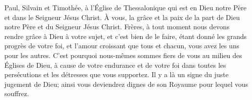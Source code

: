 Paul, Silvain et Timothée,
	à l’Église de Thessalonique qui est en Dieu notre Père
		et dans le Seigneur Jésus Christ.
À vous, la grâce et la paix de la part de Dieu notre Père et du Seigneur Jésus Christ.
Frères, à tout moment nous devons rendre grâce à Dieu à votre sujet,
	et c’est bien de le faire, étant donné les grands progrès de votre foi,
	et l’amour croissant que tous et chacun, vous avez les uns pour les autres.
C’est pourquoi nous-mêmes sommes fiers de vous au milieu des Églises de Dieu,
	à cause de votre endurance et de votre foi
	dans toutes les persécutions et les détresses que vous supportez.
Il y a là un signe du juste jugement de Dieu;
	ainsi vous deviendrez dignes de son Royaume pour lequel vous souffrez.
